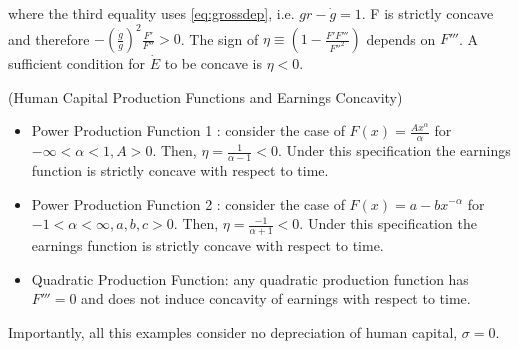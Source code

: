 \noindent where the third equality uses \eqref{eq:grossdep}, i.e. $gr - \dot{g} = 1$. F is strictly concave and therefore $-\left( \frac{\dot{g}}{g} \right)^2 \frac{F'}{F''} > 0$. The sign of $\eta \equiv \left( 1 - \frac{F'F'''}{{F''}^2} \right)$ depends on $F'''$. A sufficient condition for $\dot{E}$ to be concave is $\eta < 0$.
\begin{example} (Human Capital Production Functions and Earnings Concavity)
\begin{itemize}
\item Power Production Function 1 : consider the case of $F(x) = \frac{Ax^{\alpha}}{\alpha}$ for $ - \infty < \alpha < 1, A > 0$. Then, $\eta = \frac{1}{\alpha - 1} < 0$. Under this specification the earnings function is strictly concave with respect to time.
\item Power Production Function 2 : consider the case of $F(x) = a - b x ^ {- \alpha}$ for $ - 1 < \alpha < \infty, a,b,c > 0$. Then, $\eta = \frac{-1}{\alpha + 1} < 0$. Under this specification the earnings function is strictly concave with respect to time.
\item Quadratic Production Function: any quadratic production function has $F''' = 0$ and does not induce concavity of earnings with respect to time. 
\end{itemize}
\noindent Importantly, all this examples consider no depreciation of human capital, $\sigma = 0$. 
\end{example} 

